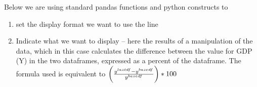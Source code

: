 \documentclass[letterpaper,10pt,english]{jupyterBook}
\begin{document}
\sphinxAtStartPar
Below we are using standard pandas functions and python constructs to
\begin{enumerate}
%
\item {} 
\sphinxAtStartPar
set the display format we want to use the  line

\item {} 
\sphinxAtStartPar
Indicate what we want to display – here the results of a manipulation of the data, which in this case calculates the difference between the value for GDP (Y) in the two dataframes, expressed as a percent of the  dataframe. The formula used is equivalent to  \(\bigg({{y^{lastdf}-y^{basedf}} \over {y^{basedf}}} \bigg)*100\)

\end{enumerate}
\end{document}
